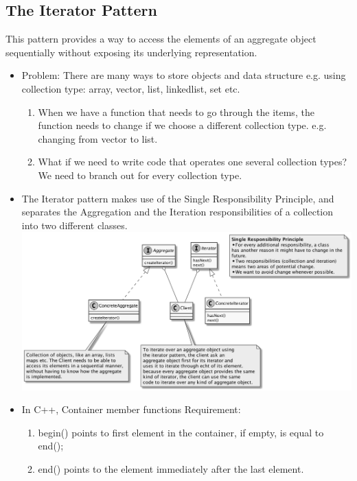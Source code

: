 \documentclass[11pt]{article}
\begin{document}
    \subsection{The Iterator Pattern}
    This pattern provides a way to access the elements of an aggregate object sequentially without exposing
    its underlying representation.
    \begin{itemize}
        \item Problem: There are many ways to store objects and data structure e.g. using collection type: array, vector,
        list, linkedlist, set etc.
        \begin{enumerate}
            \item When we have a function that needs to go through the items, the function needs to change if we choose a different
            collection type. e.g. changing from vector to list.
            \item What if we need to write code that operates one several collection types? We need to branch out for
            every collection type.
        \end{enumerate}
        \item The Iterator pattern makes use of the Single Responsibility Principle, and separates the Aggregation
        and the Iteration responsibilities of a collection into two different classes.\\
        \includegraphics[scale=0.15]{iterator/2__iterator.png}
        \item In C++, Container member functions Requirement:
        \begin{enumerate}
           \item begin() points to first element in the container, if empty, is equal to end();
           \item end() points to the element immediately after the last element.
        \end{enumerate}

\end{itemize}
\end{document}
